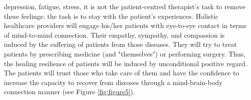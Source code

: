 \documentclass[jpm,article,submit,moreauthors,pdftex]{Definitions/mdpi}
\begin{document}
\begin{paracol}{2}
depression, fatigue, stress, it is not the patient-centred therapist’s task to remove these feelings: the task is to stay with the patient’s experiences. 
Holistic healthcare providers will engage his/her patients with eye-to-eye contact in terms of mind-to-mind connection. Their empathy, sympathy, and compassion is induced by the suffering of patients from those diseases. They will try to treat patients by prescribing medicine (and "themselves") or performing surgery.
Thus, the healing resilience of patients will be induced by unconditional positive regard. %
The patients will trust those who take care of them and have the confidence to increase the capacity to recover from diseases through a mind-brain-body connection manner (see Figure \ref{fig:figure5}).





\end{paracol}
\end{document}
